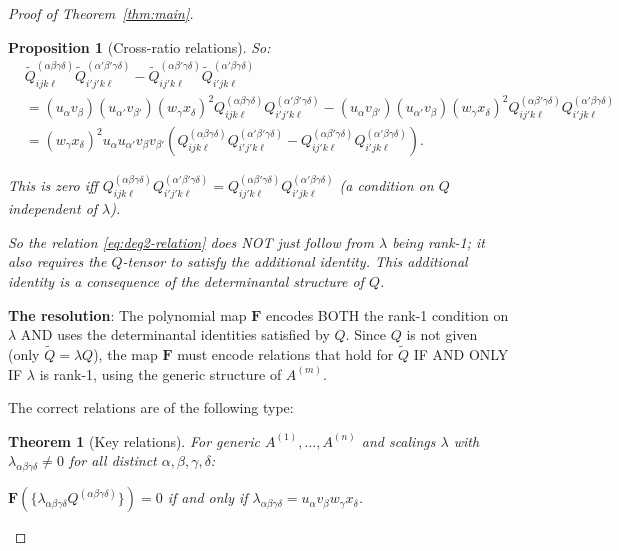 \documentclass[12pt]{article}
\newtheorem{theorem}{Theorem}
\newtheorem{proposition}{Proposition}
\theoremstyle{definition}
\begin{document}
\begin{proof}[Proof of Theorem~\ref{thm:main}]
\begin{proposition}[Cross-ratio relations]
So:
\begin{align*}
&\tilde{Q}^{(\alpha\beta\gamma\delta)}_{ijk\ell}\tilde{Q}^{(\alpha'\beta'\gamma\delta)}_{i'j'k\ell} - \tilde{Q}^{(\alpha\beta'\gamma\delta)}_{ij'k\ell}\tilde{Q}^{(\alpha'\beta\gamma\delta)}_{i'jk\ell}\\
&= (u_\alpha v_\beta)(u_{\alpha'}v_{\beta'})(w_\gamma x_\delta)^2 Q^{(\alpha\beta\gamma\delta)}_{ijk\ell}Q^{(\alpha'\beta'\gamma\delta)}_{i'j'k\ell} - (u_\alpha v_{\beta'})(u_{\alpha'}v_\beta)(w_\gamma x_\delta)^2 Q^{(\alpha\beta'\gamma\delta)}_{ij'k\ell}Q^{(\alpha'\beta\gamma\delta)}_{i'jk\ell}\\
&= (w_\gamma x_\delta)^2 u_\alpha u_{\alpha'}v_\beta v_{\beta'}(Q^{(\alpha\beta\gamma\delta)}_{ijk\ell}Q^{(\alpha'\beta'\gamma\delta)}_{i'j'k\ell} - Q^{(\alpha\beta'\gamma\delta)}_{ij'k\ell}Q^{(\alpha'\beta\gamma\delta)}_{i'jk\ell}).
\end{align*}

This is zero iff $Q^{(\alpha\beta\gamma\delta)}_{ijk\ell}Q^{(\alpha'\beta'\gamma\delta)}_{i'j'k\ell} = Q^{(\alpha\beta'\gamma\delta)}_{ij'k\ell}Q^{(\alpha'\beta\gamma\delta)}_{i'jk\ell}$ (a condition on $Q$ independent of $\lambda$).

So the relation \eqref{eq:deg2-relation} does NOT just follow from $\lambda$ being rank-1; it also requires the $Q$-tensor to satisfy the additional identity. This additional identity is a consequence of the determinantal structure of $Q$.

\end{proposition}

\textbf{The resolution}: The polynomial map $\mathbf{F}$ encodes BOTH the rank-1 condition on $\lambda$ AND uses the determinantal identities satisfied by $Q$. Since $Q$ is not given (only $\tilde{Q} = \lambda Q$), the map $\mathbf{F}$ must encode relations that hold for $\tilde{Q}$ IF AND ONLY IF $\lambda$ is rank-1, using the generic structure of $A^{(m)}$.

The correct relations are of the following type:

\begin{theorem}[Key relations]\label{thm:key-relations}
For generic $A^{(1)},\ldots,A^{(n)}$ and scalings $\lambda$ with $\lambda_{\alpha\beta\gamma\delta}\neq 0$ for all distinct $\alpha,\beta,\gamma,\delta$:

$\mathbf{F}(\{\lambda_{\alpha\beta\gamma\delta}Q^{(\alpha\beta\gamma\delta)}\}) = 0$ if and only if $\lambda_{\alpha\beta\gamma\delta} = u_\alpha v_\beta w_\gamma x_\delta$.


\end{theorem}
\end{proof}
\end{document}
